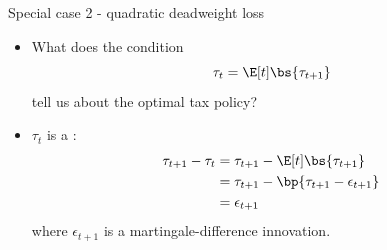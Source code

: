 \documentclass[11pt,xcolor={dvipsnames},aspectratio=159,hyperref={pdftex,pdfpagemode=UseNone,hidelinks,pdfdisplaydoctitle=true},usepdftitle=false]{beamer}
\begin{document}
    \begin{frame}{Special case 2 - quadratic deadweight loss}
    
    \begin{itemize}
    \item What does the condition \[\tau_{t}=\E[t]\bs{\tau_{t+1}}\] tell
    us about the optimal tax policy? 
    \item $\tau_{t}$ is a : 
     \begin{align*}
    \tau_{t+1}-\tau_{t} & =\tau_{t+1}-\E[t]\bs{\tau_{t+1}}\\
     & =\tau_{t+1}-\bp{\tau_{t+1}-\epsilon_{t+1}}\\
     & =\epsilon_{t+1}
    \end{align*}
    where $\epsilon_{t+1}$ is a martingale-difference innovation.
    \end{itemize}
    \end{frame}
\end{document}
